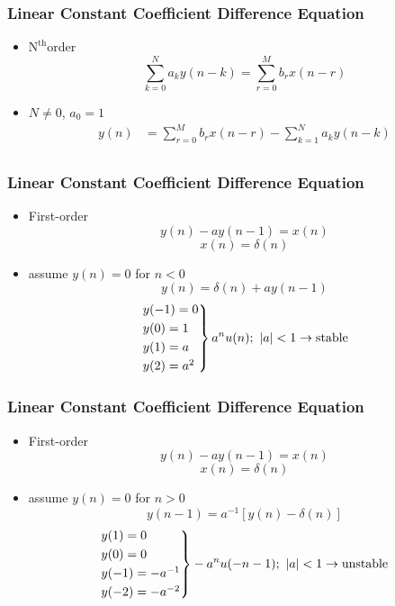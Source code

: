 \documentclass[pdflatex,compress]{beamer}
\begin{document}
\begin{frame}
	\frametitle{Linear Constant Coefficient Difference Equation}
	\begin{itemize}
		\item $ \text{N}^\text{th} $order
		\[ \sum_{k = 0}^N a_k y(n-k) = \sum_{r = 0}^M b_r x(n-r) \]
		\item $ N \neq 0 $, $ a_0 = 1 $
		\begin{align*}
		y(n) &= \sum_{r = 0}^M b_r x(n-r) - \sum_{k = 1}^N a_k y(n-k) \\
		\end{align*}
	\end{itemize}
\end{frame}

\begin{frame}
	\frametitle{Linear Constant Coefficient Difference Equation}
	\begin{itemize}
		\item First-order
		\[ y(n) - ay(n-1) = x(n) \]
		\[ x(n) = \delta(n) \]
		\item{} assume $ y(n) = 0 $ for $ n<0 $
		\[ y(n) = \delta(n) + ay(n-1) \]
		\[
			\begin{rcases*}
			y(-1)= 0 \\
			y(0) = 1 \\
			y(1) = a \\
			y(2) = a^2
			\end{rcases*} a^n u(n);~|a|<1 \rightarrow \text{stable}
		\]
	\end{itemize}
\end{frame}

\begin{frame}
	\frametitle{Linear Constant Coefficient Difference Equation}
	\begin{itemize}
		\item First-order
		\[ y(n) - ay(n-1) = x(n) \]
		\[ x(n) = \delta(n) \]
		\item{} assume $ y(n) = 0 $ for $ n>0 $
		\[ y(n-1) = a^{-1}[y(n) - \delta(n)] \]
		\[
		\begin{rcases*}
		y(1)= 0 \\
		y(0) = 0 \\
		y(-1) = -a^{-1} \\
		y(-2) = -a^{-2}
		\end{rcases*} -a^n u(-n-1);~|a|<1 \rightarrow \text{unstable}
		\]
	\end{itemize}
\end{frame}
\end{document}
